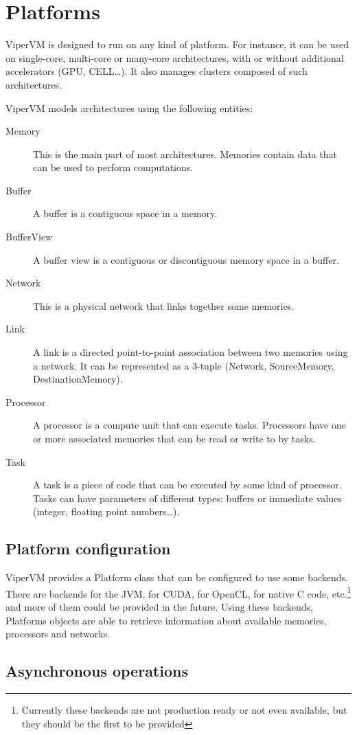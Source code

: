 \chapter{Platforms}

ViperVM is designed to run on any kind of platform. For instance, it can be
used on single-core, multi-core or many-core architectures, with or without
additional accelerators (GPU, CELL\ldots). It also manages clusters composed of
such architectures.

ViperVM models architectures using the following entities:

\begin{description}

  \item[Memory] This is the main part of most architectures. Memories contain
  data that can be used to perform computations.

  \item[Buffer] A buffer is a contiguous space in a memory.

  \item[BufferView] A buffer view is a contiguous or discontiguous memory space
  in a buffer.

  \item[Network] This is a physical network that links together some memories.

  \item[Link] A link is a directed point-to-point association between two
  memories using a network. It can be represented as a 3-tuple (Network,
  SourceMemory, DestinationMemory).

  \item[Processor] A processor is a compute unit that can execute tasks.
  Processors have one or more associated memories that can be read or write to
  by tasks.

  \item[Task] A task is a piece of code that can be executed by some kind of
  processor. Tasks can have parameters of different types: buffers or immediate
  values (integer, floating point numbers\ldots).

\end{description}

\section{Platform configuration}
ViperVM provides a Platform class that can be configured to use some backends.
There are backends for the JVM, for CUDA, for OpenCL, for native C code,
etc.\footnote{Currently these backends are not production ready or not even
available, but they should be the first to be provided} and more of them could
be provided in the future. Using these backends, Platforms objects are able to
retrieve information about available memories, processors and networks.

\section{Asynchronous operations}

